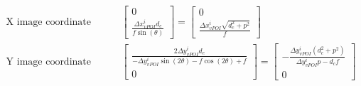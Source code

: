 \begin{align*}
\text{X image coordinate error: }&\left[\begin{matrix}0\\\frac{\Delta{x^i_{vPOI}} d_{c}}{f \sin{\left(\theta \right)}}\end{matrix}\right] = \left[\begin{matrix}0\\\frac{\Delta{x^i_{vPOI}} \sqrt{d_{c}^{2} + p^{2}}}{f}\end{matrix}\right] \\
\text{Y image coordinate error: }&\left[\begin{matrix}\frac{2 \Delta{y^i_{vPOI}} d_{c}}{- \Delta{y^i_{vPOI}} \sin{\left(2 \theta \right)} - f \cos{\left(2 \theta \right)} + f}\\0\end{matrix}\right] = \left[\begin{matrix}- \frac{\Delta{y^i_{vPOI}} \left(d_{c}^{2} + p^{2}\right)}{\Delta{y^i_{vPOI}} p - d_{c} f}\\0\end{matrix}\right] \\
\end{align*}
